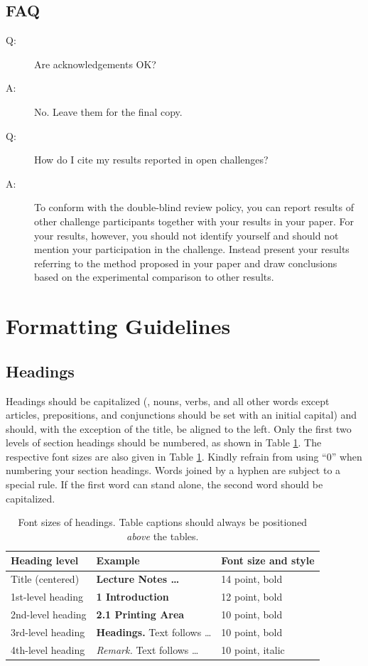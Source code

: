 \documentclass[runningheads]{llncs}
\begin{document}
\subsection*{FAQ}
\begin{description}
  \item[Q:] Are acknowledgements OK?
  \item[A:] No.  Leave them for the final copy.
  \medskip
  \item[Q:] How do I cite my results reported in open challenges?
  \item[A:] To conform with the double-blind review policy, you can report results of other challenge participants together with your results in your paper.
    For your results, however, you should not identify yourself and should not mention your participation in the challenge.
    Instead present your results referring to the method proposed in your paper and draw conclusions based on the experimental comparison to other results.
\end{description}


\section{Formatting Guidelines}

\subsection{Headings}
Headings should be capitalized (\ie, nouns, verbs, and all other words except articles, prepositions, and conjunctions should be set with an initial capital) and should, with the exception of the title, be aligned to the left.
Only the first two levels of section headings should be numbered, as shown in Table \cref{tab:headings}.
The respective font sizes are also given in Table \cref{tab:headings}. 
Kindly refrain from using ``0'' when numbering your section headings.
Words joined by a hyphen are subject to a special rule. 
If the first word can stand alone, the second word should be capitalized.

\begin{table}[tb]
  \caption{Font sizes of headings. 
    Table captions should always be positioned \emph{above} the tables.
  }
  \label{tab:headings}
  \centering
  \begin{tabular}{@{}lll@{}}
    \toprule
    Heading level & Example & Font size and style\\
    \midrule
    Title (centered)  & {\Large\bf Lecture Notes \dots} & 14 point, bold\\
    1st-level heading & {\large\bf 1 Introduction} & 12 point, bold\\
    2nd-level heading & {\bf 2.1 Printing Area} & 10 point, bold\\
    3rd-level heading & {\bf Headings.} Text follows \dots & 10 point, bold\\
    4th-level heading & {\it Remark.} Text follows \dots & 10 point, italic\\
  \bottomrule
  \end{tabular}
\end{table}
\end{document}
